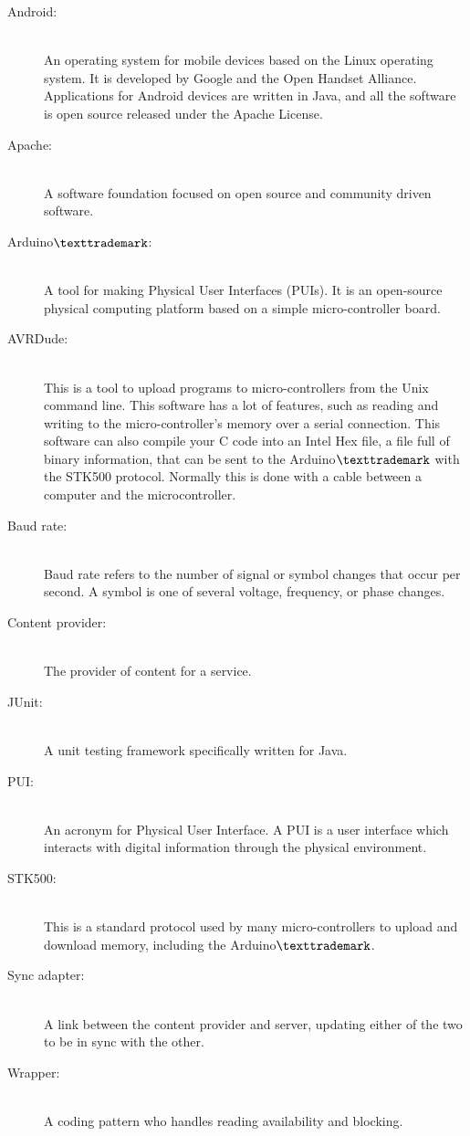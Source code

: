 \begin{description}
	\item[Android:]\hfill \\
		An operating system for mobile devices based on the Linux operating system. It is developed by Google and the Open Handset Alliance. Applications for Android devices are written in Java, and all the software is open source released under the Apache License.
	\item[Apache:] \hfill \\
		A software foundation focused on open source and community driven software.
	\item[Arduino$\texttrademark$:]\hfill \\
		A tool for making Physical User Interfaces (PUIs). It is an open-source physical computing platform based on a simple micro-controller board.
	\item[AVRDude:]\hfill \\
		This is a tool to upload programs to micro-controllers from the Unix command line. This software has a lot of features, such as reading and writing to the micro-controller's memory over a serial connection. This software can also compile your C code into an Intel Hex file, a file full of binary information, that can be sent to the Arduino$\texttrademark$ with the STK500 protocol. Normally this is done with a cable between a computer and the microcontroller.
	\item[Baud rate:]\hfill \\
		Baud rate refers to the number of signal or symbol changes that occur per second. A symbol is one of several voltage, frequency, or phase changes. \cite{baudrate}
	\item[Content provider:]\hfill \\
		The provider of content for a service. 
	\item[JUnit:]\hfill \\
		A unit testing framework specifically written for Java.
	\item[PUI:]\hfill \\
		An acronym for Physical User Interface. A PUI is a user interface which interacts with digital information through the physical environment.
	\item[STK500:]\hfill \\
		This is a standard protocol used by many micro-controllers to upload and download memory, including the Arduino$\texttrademark$.
	\item[Sync adapter:]\hfill \\
		A link between the content provider and server, updating either of the two to be in sync with the other.
	\item[Wrapper:]\hfill \\
		A coding pattern who handles reading availability and blocking.
\end{description}
